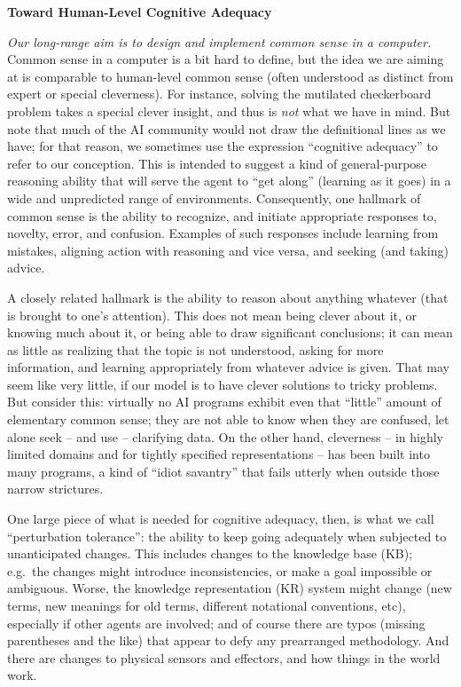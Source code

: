 \documentclass[12pt]{article}
\begin{document}
\centerline{\bf Toward Human-Level Cognitive Adequacy}


{\em Our long-range aim is to design and implement common sense in a computer.}
Common sense in a computer is a bit hard to define, but the idea we
are aiming at is comparable to human-level common sense (often
understood as distinct from expert or special cleverness).  For
instance, solving the mutilated checkerboard problem takes a special
clever insight, and thus is {\em not} what we have in mind. But note
that much of the AI community would not draw the definitional lines as
we have; for that reason, we sometimes use the expression ``cognitive
adequacy'' to refer to our conception.  This is intended to suggest a
kind of general-purpose reasoning ability that will serve the agent to
``get along'' (learning as it goes) in a wide and unpredicted range of
environments.  Consequently, one hallmark of common sense is the
ability to recognize, and initiate appropriate responses to, novelty,
error, and confusion.  Examples of such responses include learning
from mistakes, aligning action with reasoning and vice versa, and
seeking (and taking) advice.

A closely related hallmark is the ability to reason about anything whatever
(that is brought to one's attention). This does not mean being
clever about it, or knowing much about it, or being able to
draw significant conclusions; it can mean as little as realizing that
the topic is not understood, asking for more information, and learning
appropriately from whatever advice is given.  That may seem like very
little, if our model is to have clever solutions to tricky problems. But
consider this: virtually no AI programs exhibit even that ``little''
amount of elementary common sense; they are not able to know when they
are confused, let alone seek -- and use -- clarifying data. On the
other hand, cleverness -- in highly limited domains and for tightly
specified representations -- has been built into many programs, a kind
of ``idiot savantry'' that fails utterly when outside those narrow
strictures.

One large piece of what is needed for cognitive adequacy, then, is
what we call ``perturbation tolerance'': the ability to keep going
adequately when subjected to unanticipated changes.  This includes
changes to the knowledge base (KB); e.g.~the
changes might introduce inconsistencies, or make a goal impossible or
ambiguous. Worse, the knowledge representation (KR) system might
change (new terms, new meanings for old terms, different notational
conventions, etc), especially if other agents are involved; and of
course there are typos (missing parentheses and the like) that appear
to defy any prearranged methodology.  And there are
changes to physical sensors and effectors, and how things in
the world work.
\end{document}
